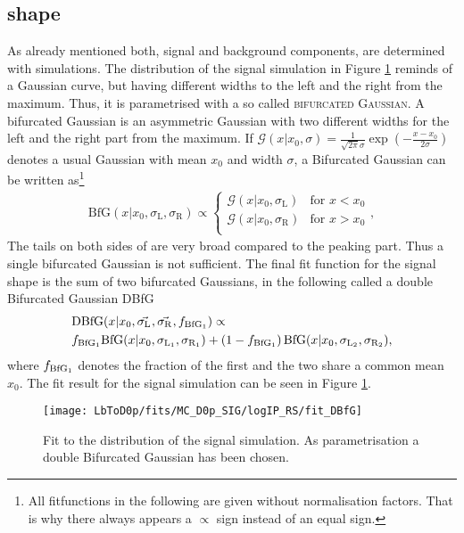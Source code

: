 \subsection{\logIP shape}
As already mentioned both, \logIP signal and background components, are determined with simulations.
The \logIP distribution of the signal simulation in Figure \ref{fig:fit_logIP_signal} reminds of a Gaussian curve, but having different widths to the left and the right from the maximum.
Thus, it is parametrised with a so called \textsc{bifurcated Gaussian}.
A bifurcated Gaussian is an asymmetric Gaussian with two different widths for the left and the right part from the maximum.
If $\mathcal{G}(x|x_0,\sigma) = \frac{1}{\sqrt{2\pi}\sigma}\exp\left(-\frac{x-x_0}{2\sigma}\right)$ denotes a usual Gaussian with mean $x_0$ and width $\sigma$, a Bifurcated Gaussian can be written as\footnote{All fitfunctions in the following are given without normalisation factors. That is why there always appears a $\propto$ sign instead of an equal sign.}
\begin{align}
    \text{BfG}(x|x_0, \sigma_{\text{L}}, \sigma_{\text{R}}) \propto 
    \begin{cases}
        \mathcal{G}(x|x_0,\sigma_{\text{L}}) & \text{for } x < x_0 \\   
        \mathcal{G}(x|x_0,\sigma_{\text{R}}) & \text{for } x > x_0 \\   
    \end{cases},
\end{align}
The tails on both sides of \logIP are very broad compared to the peaking part.
Thus a single bifurcated Gaussian is not sufficient.
The final fit function for the signal \logIP shape is the sum of two bifurcated Gaussians, in the following called a double Bifurcated Gaussian DBfG
\begin{align}
    &\text{DBfG}(x|x_0,\vec{\sigma_{\text{L}_{}}}, \vec{\sigma_{\text{R}_{}}}, f_{\text{BfG}_1}) \propto \nonumber \\
    &f_{\text{BfG}_1} \text{BfG}(x|x_0,\sigma_{\text{L}_{1}}, \sigma_{\text{R}_{1}}) + \left(1 - f_{\text{BfG}_1} \right) \text{BfG}(x|x_0,\sigma_{\text{L}_{2}}, \sigma_{\text{R}_{2}}),
\end{align}
where $f_{\text{BfG}_1}$ denotes the fraction of the first \BfG and the two \BfG share a common mean $x_0$. 
The fit result for the signal simulation can be seen in Figure \ref{fig:fit_logIP_signal}.
\begin{figure}[tb]
    \centering
	\texttt{[image: LbToD0p/fits/MC\_D0p\_SIG/logIP\_RS/fit\_DBfG]}
	\caption{Fit to the \logIP distribution of the signal simulation. As parametrisation a double Bifurcated Gaussian has been chosen.}
    \label{fig:fit_logIP_signal}
\end{figure}
